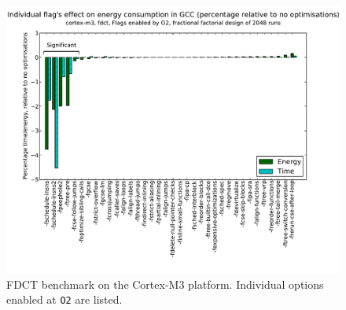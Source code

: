 \documentclass[twocolumn]{article}
\let\oldcaption\caption
\renewcommand{\caption}[1]{\oldcaption{\textup{#1}}}
\begin{document}
\begin{figure}[t!]
	\includegraphics[width=\linewidth,clip,trim=0.5cm 0 2cm 1.8cm]{cortex-m3/O2_main_effects_fdct.pdf}
	\caption{FDCT benchmark on the Cortex-M3 platform. Individual options enabled at \texttt{O2} are listed.}
	\label{Fig:FdctO2MainEffects}
\end{figure}
\end{document}
